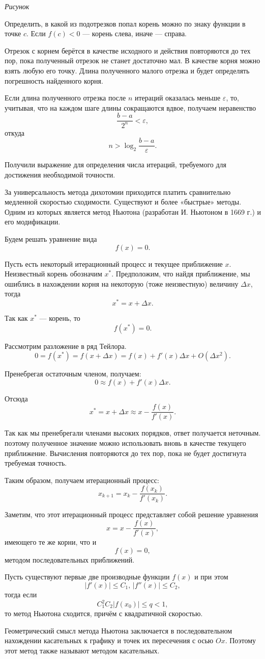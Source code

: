 \emph{Рисунок}

Определить, в какой из подотрезков попал корень можно по знаку функции
в точке $c$. Если $f(c)<0$ — корень слева, иначе — справа.

Отрезок с корнем берётся в качестве исходного и действия повторяются
до тех пор, пока полученный отрезок не станет достаточно мал. В
качестве корня можно взять любую его точку. Длина полученного малого
отрезка и будет определять погрешность найденного корня.

Если длина полученного отрезка после $n$ итераций оказалась меньше
$\varepsilon$, то, учитывая, что на каждом шаге длины сокращаются
вдвое, получаем неравенство
\[
\frac{b-a}{2^{n}}<\varepsilon,
\]
откуда
\[
n>\log_{2}\frac{b-a}{\varepsilon}.
\]


Получили выражение для определения числа итераций, требуемого для
достижения необходимой точности.



За универсальность метода дихотомии приходится платить сравнительно
медленной скоростью сходимости. Существуют и более «быстрые» методы.
Одним из которых является метод Ньютона (разработан И. Ньютоном в
1669 г.) и его модификации.

Будем решать уравнение вида 
\[
f(x)=0.
\]


Пусть есть некоторый итерационный процесс и текущее приближение $x$.
Неизвестный корень обозначим $x^{*}$. Предположим, что найдя
приближение, мы ошиблись в нахождении корня на некоторую (тоже
неизвестную) величину $\Delta x$, тогда
\[
x^{*}=x+\Delta x.
\]


Так как $x^{*}$ — корень, то
\[
f(x^{*})=0.
\]


Рассмотрим разложение в ряд Тейлора.
\[
0=f(x^{*})=f(x+\Delta x)=f(x)+f'(x)\Delta x+O(\Delta x^{2}).
\]


Пренебрегая остаточным членом, получаем:
\[
0\approx f(x)+f'(x)\Delta x.
\]


Отсюда
\[
x^{*}=x+\Delta x\approx x-\frac{f(x)}{f'(x)}.
\]


Так как мы пренебрегали членами высоких порядков, ответ получается
неточным. поэтому полученное значение можно использовать вновь в качестве
текущего приближение. Вычисления повторяются до тех пор, пока не будет
достигнута требуемая точность.

Таким образом, получаем итерационный процесс:
\[
x_{k+1}=x_{k}-\frac{f(x_{k})}{f'(x_{k})}.
\]


Заметим, что этот итерационный процесс представляет собой решение
уравнения
\[
x=x-\frac{f(x)}{f'(x)},
\]
имеющего те же корни, что и
\[
f(x)=0,
\]
методом последовательных приближений.
\begin{thm}
Пусть существуют первые две производные функции $f(x)$ и при этом
\[
|f'(x)|\leqslant C_{1},\,|f''(x)|\leqslant C_{2},
\]
тогда если
\[
C_{1}^{2}C_{2}|f(x_{0})|\leqslant q<1,
\]
то метод Ньютона сходится, причём с квадратичной скоростью.
\end{thm}
Геометрический смысл метода Ньютона заключается в последовательном
нахождении касательных к графику и точек их пересечения с осью $Ox$.
Поэтому этот метод также называют методом касательных.

